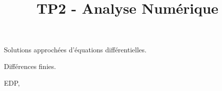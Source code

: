 \documentclass[10pt]{article}
\title{TP2 - Analyse Numérique}
\author{}
\date{}
\begin{document}
\sffamily
\maketitle

Solutions approchées d'équations différentielles. 

Différences finies. 

EDP, 
\end{document}

